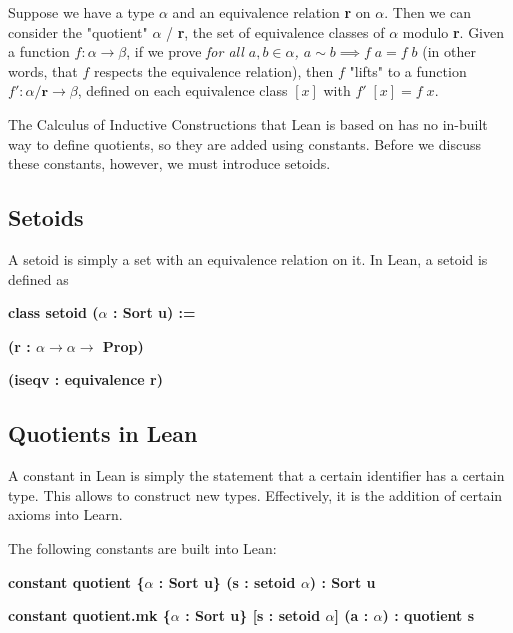 \documentclass[runningheads,a4paper]{llncs}
\renewcommand{\a}{\alpha}
\renewcommand{\b}{\beta}
\renewcommand{\-}{\setminus}
\begin{document}
Suppose we have a type $\a$ and an equivalence relation \textbf{r} on $\a$. Then we can consider the "quotient" $\a$ / \textbf{r}, the set of equivalence classes of $\a$ modulo \textbf{r}. Given a function $f : \a \to \b$, if we prove \textit{for all $a, b \in \a$, $a \sim b \implies f \; a = f\; b$} (in other words, that $f$ respects the equivalence relation), then $f$ "lifts" to a function $f' : \a / \textbf{r} \to \b$, defined on each equivalence class $[x]$ with $f'\; [x] = f\; x$.

The Calculus of Inductive Constructions that Lean is based on has no in-built way to define quotients, so they are added using constants. Before we discuss these constants, however, we must introduce setoids.

\subsection{Setoids}

A setoid is simply a set with an equivalence relation on it. In Lean, a setoid is defined as

\vspace{2 mm}
\hspace{2 em}\textbf{class setoid ($\a$ : Sort u) :=}

\hspace{4 em}\textbf{(r : $\a \to \a \to$ Prop)}

\hspace{4 em}\textbf{(iseqv : equivalence r)}
\vspace{2 mm}

\subsection{Quotients in Lean}

A constant in Lean is simply the statement that a certain identifier has a certain type. This allows to construct new types. Effectively, it is the addition of certain axioms into Learn. 

The following constants are built into Lean:

\vspace{2 mm}
\hspace{2 em}\textbf{constant quotient \{$\a$ : Sort u\} (s : setoid $\a$) : Sort u}

\vspace{4 mm}

\hspace{2 em}\textbf{constant quotient.mk \{$\a$ : Sort u\} [s : setoid $\a$] (a : $\a$) : quotient s}
\end{document}
